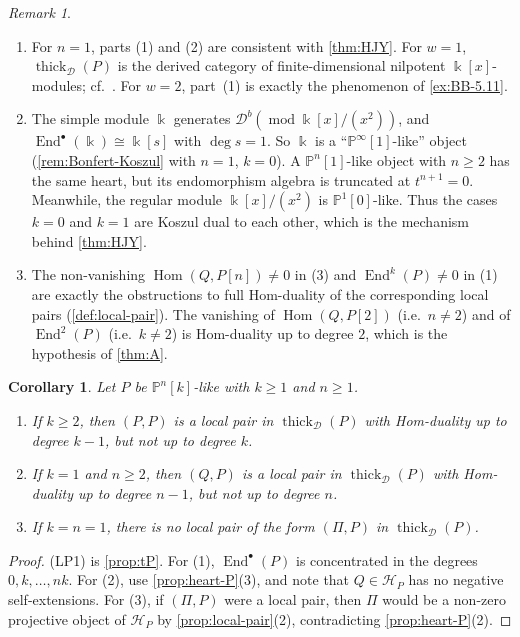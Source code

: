 \documentclass[11pt,reqno]{amsart}
\theoremstyle{plain}
\newtheorem{corollary}[theorem]{Corollary}
\theoremstyle{definition}
\theoremstyle{remark}
\newtheorem{remark}[theorem]{Remark}
\newcommand{\kk}{\Bbbk}
\DeclareMathOperator{\Hom}{Hom}
\DeclareMathOperator{\End}{End}
\newcommand{\modd}{\operatorname{mod}}
\newcommand{\Db}{\mathcal{D}^b}
\newcommand{\thick}[2][\cD]{\operatorname{thick}_{#1}(#2)}
\newcommand{\Pn}[2]{\mathbb{P}^{#1}[#2]}
\newcommand{\cD}{\mathcal{D}}
\newcommand{\cH}{\mathcal{H}}
\begin{document}
\begin{remark}\label{rem:koszul}
\leavevmode
\begin{enumerate}
\item For $n=1$, parts (1) and (2) are consistent with \cref{thm:HJY}. For $w=1$, $\thick P$ is the derived category of finite-dimensional nilpotent $\kk[x]$-modules; cf.\ \cite[Lemma~3.11(3), Cor.~4.16(2)]{Bonf26}. For $w=2$, part~(1) is exactly the phenomenon of \cref{ex:BB-5.11}.
\item The simple module $\kk$ generates $\Db(\modd\kk[x]/(x^2))$, and $\End^\bullet(\kk)\cong\kk[s]$ with $\deg s=1$. So $\kk$ is a ``$\Pn\infty1$-like'' object (\cref{rem:Bonfert-Koszul} with $n=1$, $k=0$). A $\Pn n1$-like object with $n\ge2$ has the same heart, but its endomorphism algebra is truncated at $t^{n+1}=0$. Meanwhile, the regular module $\kk[x]/(x^2)$ is $\Pn10$-like. Thus the cases $k=0$ and $k=1$ are Koszul dual to each other, which is the mechanism behind \cref{thm:HJY}.
\item The non-vanishing $\Hom(Q,P[n])\ne0$ in (3) and $\End^{k}(P)\ne0$ in (1) are exactly the obstructions to full Hom-duality of the corresponding local pairs (\cref{def:local-pair}). The vanishing of $\Hom(Q,P[2])$ (i.e.\ $n\ne2$) and of $\End^2(P)$ (i.e.\ $k\ne2$) is Hom-duality up to degree $2$, which is the hypothesis of \cref{thm:A}.
\end{enumerate}
\end{remark}



\begin{corollary}\label{cor:P-local-pairs}
Let $P$ be $\Pn nk$-like with $k\ge1$ and $n\ge1$.
\begin{enumerate}
\item If $k\ge2$, then $(P,P)$ is a local pair in $\thick{P}$ with Hom-duality up to degree $k-1$, but not up to degree $k$.
\item If $k=1$ and $n\ge2$, then $(Q,P)$ is a local pair in $\thick{P}$ with Hom-duality up to degree $n-1$, but not up to degree $n$.
\item If $k=n=1$, there is no local pair of the form $(\Pi,P)$ in $\thick{P}$.
\end{enumerate}
\end{corollary}

\begin{proof}
(LP1) is \cref{prop:tP}. For (1), $\End^\bullet(P)$ is concentrated in the degrees $0,k,\dots,nk$. For (2), use \cref{prop:heart-P}(3), and note that $Q\in\cH_P$ has no negative self-extensions. For (3), if $(\Pi,P)$ were a local pair, then $\Pi$ would be a non-zero projective object of $\cH_P$ by \cref{prop:local-pair}(2), contradicting \cref{prop:heart-P}(2).
\end{proof}
\end{document}
